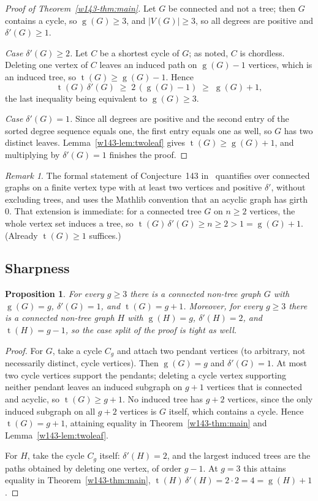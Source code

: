 \documentclass[11pt]{article}
\numberwithin{equation}{section}
\newtheorem{proposition}[theorem]{Proposition}
\theoremstyle{remark}
\newtheorem{remark}[theorem]{Remark}
\newcommand{\tr}{\operatorname{t}}
\newcommand{\gr}{\operatorname{g}}
\newcommand{\dd}{\delta'}
\begin{document}
\begin{proof}[Proof of Theorem~\ref{w143-thm:main}]
Let $G$ be connected and not a tree; then $G$ contains a cycle, so
$\gr(G)\ge3$, and $|V(G)|\ge3$, so all degrees are positive and $\dd(G)\ge1$.

\emph{Case $\dd(G)\ge2$.}  Let $C$ be a shortest cycle of $G$; as noted, $C$
is chordless.  Deleting one vertex of $C$ leaves an induced path on
$\gr(G)-1$ vertices, which is an induced tree, so $\tr(G)\ge\gr(G)-1$.  Hence
\[
  \tr(G)\,\dd(G)\;\ge\;2\,(\gr(G)-1)\;\ge\;\gr(G)+1,
\]
the last inequality being equivalent to $\gr(G)\ge3$.

\emph{Case $\dd(G)=1$.}  Since all degrees are positive and the second entry
of the sorted degree sequence equals one, the first entry equals one as well,
so $G$ has two distinct leaves.  Lemma~\ref{w143-lem:twoleaf} gives
$\tr(G)\ge\gr(G)+1$, and multiplying by $\dd(G)=1$ finishes the proof.
\end{proof}

\begin{remark}
The formal statement of Conjecture~143 in~\cite{FC143} quantifies over
connected graphs on a finite vertex type with at least two vertices and
positive $\dd$, without excluding trees, and uses the Mathlib convention that
an acyclic graph has girth $0$.  That extension is immediate: for a connected
tree $G$ on $n\ge2$ vertices, the whole vertex set induces a tree, so
$\tr(G)\,\dd(G)\ge n\ge2>1=\gr(G)+1$.  (Already $\tr(G)\ge1$ suffices.)
\end{remark}

\subsection{Sharpness}\label{w143-sec:sharp}

\begin{proposition}\label{w143-prop:sharp}
For every $g\ge3$ there is a connected non-tree graph $G$ with $\gr(G)=g$,
$\dd(G)=1$, and $\tr(G)=g+1$.  Moreover, for every $g\ge3$ there is a
connected non-tree graph $H$ with $\gr(H)=g$, $\dd(H)=2$, and
$\tr(H)=g-1$, so the case split of the proof is tight as well.
\end{proposition}

\begin{proof}
For $G$, take a cycle $C_g$ and attach two pendant vertices (to arbitrary,
not necessarily distinct, cycle vertices).  Then $\gr(G)=g$ and $\dd(G)=1$.
At most two cycle vertices support the pendants; deleting a cycle vertex
supporting neither pendant leaves an induced subgraph on $g+1$ vertices that
is connected and acyclic, so $\tr(G)\ge g+1$.  No induced tree has $g+2$
vertices, since the only induced subgraph on all $g+2$ vertices is $G$
itself, which contains a cycle.  Hence $\tr(G)=g+1$, attaining equality in
Theorem~\ref{w143-thm:main} and Lemma~\ref{w143-lem:twoleaf}.

For $H$, take the cycle $C_g$ itself: $\dd(H)=2$, and the largest induced
trees are the paths obtained by deleting one vertex, of order $g-1$.  At
$g=3$ this attains equality in Theorem~\ref{w143-thm:main},
$\tr(H)\,\dd(H)=2\cdot2=4=\gr(H)+1$.
\end{proof}
\end{document}
